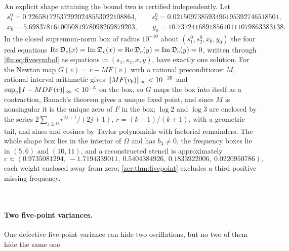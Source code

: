 \begin{remark}\label{flu:rem:fivewitness}
An explicit shape attaining the bound two is certified independently. Let
\begin{gather*}
 s_1^0=0.226581725372920248553022108864,\qquad s_2^0=0.021509738593496195392746518501,\\
 x_0=5.698378161005081978098269879203,\qquad y_0=10.737241689185610111079863383138 .
\end{gather*}
In the closed supremum-norm box of radius $10^{-10}$ about $(s_1^0,s_2^0,x_0,y_0)$ the four real equations
$\operatorname{Re}\mathfrak{D}_c(x)=\operatorname{Im}\mathfrak{D}_c(x)=\operatorname{Re}\mathfrak{D}_c(y)=\operatorname{Im}\mathfrak{D}_c(y)=0$, written through \eqref{flu:eq:fivesymbol} as
equations in $(s_1,s_2,x,y)$, have exactly one solution. For the Newton map $G(v)=v-MF(v)$ with a rational
preconditioner $M$, rational interval arithmetic gives $\lVert MF(v_0)\rVert_\infty<10^{-25}$ and
$\sup_v\lVert I-MDF(v)\rVert_\infty<10^{-5}$ on the box, so $G$ maps the box into itself as a contraction, Banach's
theorem gives a unique fixed point, and since $M$ is nonsingular it is the unique zero of $F$ in the box; $\log2$ and $\log3$ are enclosed by the series
$2\sum_{j\ge0}r^{2j+1}/(2j+1)$, $r=(k-1)/(k+1)$, with a geometric tail, and sines and cosines by Taylor
polynomials with factorial remainders. The whole shape box lies in the interior of $\Omega$ and has $b_3\ne0$,
the frequency boxes lie in $(5,6)$ and $(10,11)$, and a reconstructed stencil is approximately
\[
 c\approx(0.9735081294,\ -1.7194339011,\ 0.5404384926,\ 0.1833922006,\ 0.0220950786),
\]
each weight enclosed away from zero; \cref{zer:thm:fivepoint} excludes a third positive missing frequency.
\begin{center}
\\
\end{center}
\end{remark}

\paragraph{Two five-point variances.}
One defective five-point variance can hide two oscillations, but no two of them hide the same one.

